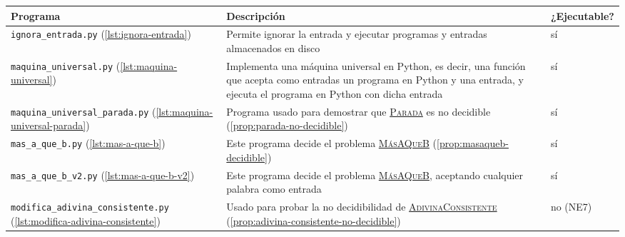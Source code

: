\newpage

\vspace*{0.9cm}

\begin{tabularx}{\textwidth}{L{0.3} L{0.5} L{0.2}}
\midrule
Programa & Descripción & ¿Ejecutable? \\
\midrule
\texttt{ignora\_entrada.py} \linebreak \small{(\cref{lst:ignora-entrada})} \vspace{4pt} & Permite ignorar la entrada y ejecutar programas y entradas almacenados en disco & sí \\

\texttt{maquina\_universal.py} \linebreak \small{(\cref{lst:maquina-universal})} & Implementa una máquina universal en Python, es decir, una función que acepta como entradas un programa en Python y una entrada, y ejecuta el programa en Python con dicha entrada \vspace{4pt} & sí \\

\texttt{maquina\_universal}\linebreak\texttt{\_parada.py} \linebreak \small{(\cref{lst:maquina-universal-parada})} \vspace{4pt} & Programa usado para demostrar que \hyperref[prob:parada]{\textsc{Parada}} es no decidible (\cref{prop:parada-no-decidible}) & sí \\

\texttt{mas\_a\_que\_b.py} \linebreak \small{(\cref{lst:mas-a-que-b})} & Este programa decide el problema \hyperref[prob:mas-a-que-b]{\textsc{MásAQueB}} (\cref{prop:masaqueb-decidible}) \vspace{4pt} & sí \\

\texttt{mas\_a\_que\_b\_v2.py} \linebreak \small{(\cref{lst:mas-a-que-b-v2})} & Este programa decide el problema \hyperref[prob:mas-a-que-b]{\textsc{MásAQueB}}, aceptando cualquier palabra como entrada \vspace{4pt} & sí \\

\texttt{modifica\_adivina}\linebreak\texttt{\_consistente.py}  \linebreak \small{(\cref{lst:modifica-adivina-consistente})} & Usado para probar la no decidibilidad de \hyperref[prob:adivina-consistente]{\textsc{AdivinaConsistente}} (\cref{prop:adivina-consistente-no-decidible}) \vspace{4pt} & no (NE7) \\


\end{tabularx}
